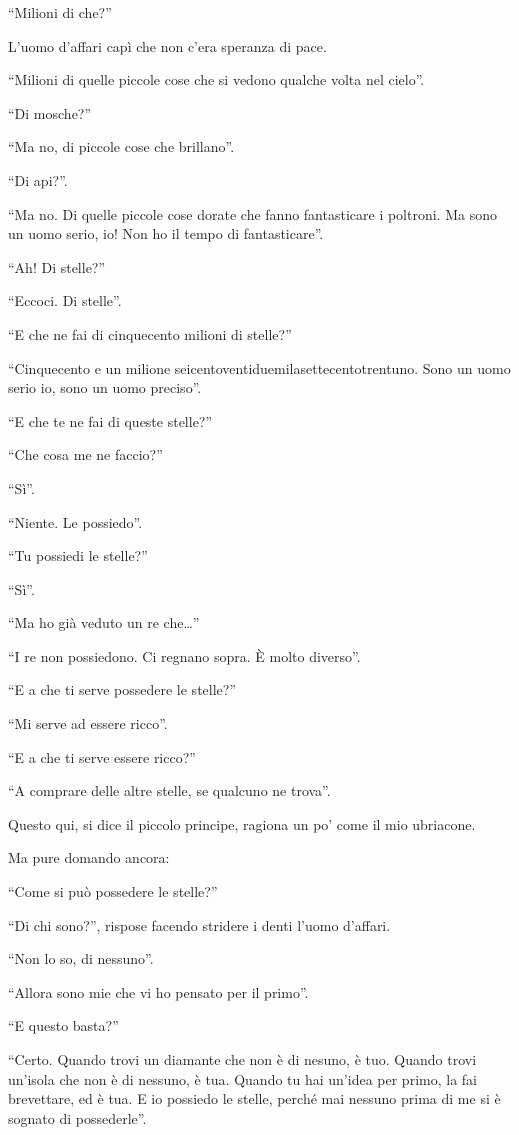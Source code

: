 \documentclass[11pt]{scrbook}
\begin{document}
``Milioni di che?''

L'uomo d'affari capì che non c'era speranza di pace.

``Milioni di quelle piccole cose che si vedono qualche volta nel
cielo''.

``Di mosche?''

``Ma no, di piccole cose che brillano''.

``Di api?''.

``Ma no. Di quelle piccole cose dorate che fanno fantasticare i
poltroni. Ma sono un uomo serio, io! Non ho il tempo di fantasticare''.

``Ah! Di stelle?''

``Eccoci. Di stelle''.

``E che ne fai di cinquecento milioni di stelle?''

``Cinquecento e un milione seicentoventiduemilasettecentotrentuno. Sono un uomo serio io, sono un uomo preciso''.

``E che te ne fai di queste stelle?''

``Che cosa me ne faccio?''

``Sì''.

``Niente. Le possiedo''.

``Tu possiedi le stelle?''

``Sì''.

``Ma ho già veduto un re che\ldots{}''

``I re non possiedono. Ci regnano sopra. È molto diverso''.

``E a che ti serve possedere le stelle?''

``Mi serve ad essere ricco''.

``E a che ti serve essere ricco?''

``A comprare delle altre stelle, se qualcuno ne trova''.

Questo qui, si dice il piccolo principe, ragiona un po' come il mio
ubriacone.

Ma pure domando ancora:

``Come si può possedere le stelle?''

``Di chi sono?'', rispose facendo stridere i denti l'uomo d'affari.

``Non lo so, di nessuno''.

``Allora sono mie che vi ho pensato per il primo''.

``E questo basta?''

``Certo. Quando trovi un diamante che non è di nesuno, è tuo. Quando
trovi un'isola che non è di nessuno, è tua. Quando tu hai un'idea per
primo, la fai brevettare, ed è tua. E io possiedo le stelle, perché mai
nessuno prima di me si è sognato di possederle''.
\end{document}
